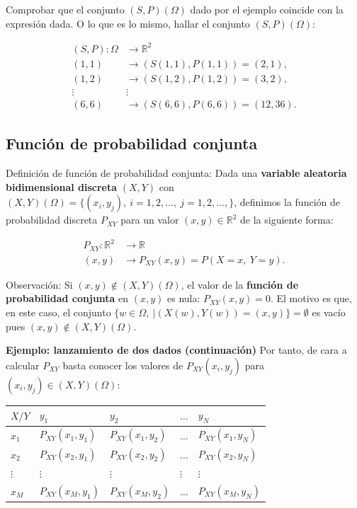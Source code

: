 \documentclass[]{book}
\begin{document}
Comprobar que el conjunto \((S,P)(\Omega)\) dado por el ejemplo coincide con la expresión dada.
O lo que es lo mismo, hallar el conjunto \((S,P)(\Omega)\):

\[
\begin{array}{rl}
(S,P): \Omega & \longrightarrow \mathbb{R}^2\\
(1,1) & \longrightarrow (S(1,1),P(1,1))=(2,1),\\
(1,2) & \longrightarrow (S(1,2),P(1,2))=(3,2),\\
\vdots & \vdots \\
(6,6) & \longrightarrow (S(6,6),P(6,6))=(12,36).
\end{array}
\]

\hypertarget{funciuxf3n-de-probabilidad-conjunta}{%
\subsection{Función de probabilidad conjunta}\label{funciuxf3n-de-probabilidad-conjunta}}

Definición de función de probabilidad conjunta:
Dada una \textbf{variable aleatoria bidimensional discreta} \((X,Y)\) con \((X,Y)(\Omega)=\{(x_i,y_j),\ i=1,2,\ldots,\ j=1,2,\ldots,\}\), definimos la función de probabilidad discreta \(P_{XY}\) para un valor \((x,y)\in\mathbb{R}^2\) de la siguiente forma:

\[
\begin{array}{rl}
P_{XY}: \mathbb{R}^2 & \longrightarrow \mathbb{R}\\
(x,y) & \longrightarrow P_{XY}(x,y)=P(X= x,\ Y= y).
\end{array}
\]

Observación:
Si \((x,y)\not\in (X,Y)(\Omega)\), el valor de la \textbf{función de probabilidad conjunta} en \((x,y)\) es nula: \(P_{XY}(x,y)=0\). El motivo es que, en este caso, el conjunto \(\{w\in\Omega,\ | (X(w),Y(w))=(x,y)\}=\emptyset\) es vacío pues \((x,y)\not\in (X,Y)(\Omega)\).

\textbf{Ejemplo: lanzamiento de dos dados (continuación)}
Por tanto, de cara a calcular \(P_{XY}\) basta conocer los valores de \(P_{XY}(x_i,y_j)\) para \((x_i,y_j)\in (X,Y)(\Omega)\):

\begin{longtable}[]{@{}lllll@{}}
\toprule
\(X/Y\) & \(y_1\) & \(y_2\) & \(\ldots\) & \(y_N\)\tabularnewline
\midrule
\endhead
\(x_1\) & \(P_{XY}(x_1,y_1)\) & \(P_{XY}(x_1,y_2)\) & \(\ldots\) & \(P_{XY}(x_1,y_N)\)\tabularnewline
\(x_2\) & \(P_{XY}(x_2,y_1)\) & \(P_{XY}(x_2,y_2)\) & \(\ldots\) & \(P_{XY}(x_2,y_N)\)\tabularnewline
\(\vdots\) & \(\vdots\) & \(\vdots\) & \(\vdots\) & \(\vdots\)\tabularnewline
\(x_M\) & \(P_{XY}(x_M,y_1)\) & \(P_{XY}(x_M,y_2)\) & \(\ldots\) & \(P_{XY}(x_M,y_N)\)\tabularnewline
\bottomrule
\end{longtable}
\end{document}
